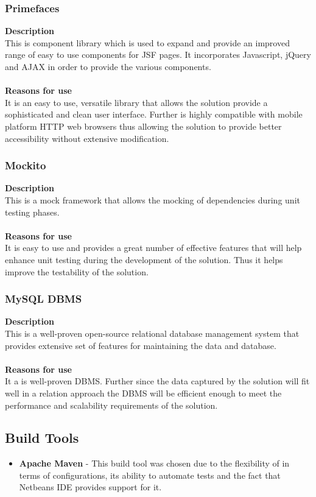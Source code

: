 \documentclass[12pt]{article}
\begin{document}
\subsubsection{Primefaces}
\textbf{Description}\\
This is component library which is used to expand and provide an improved range of easy to use components for JSF pages. It incorporates Javascript, jQuery and AJAX in order to provide the various components.\\\\
\textbf{Reasons for use}\\
It is an easy to use, versatile library that allows the solution provide a sophisticated and clean user interface. Further is highly compatible with mobile platform HTTP web browsers thus allowing the solution to provide better accessibility without extensive modification.    

\subsubsection{Mockito}
\textbf{Description}\\
This is a mock framework that allows the mocking of dependencies during unit testing phases.\\\\
\textbf{Reasons for use}\\
It is easy to use and provides a great number of effective features that will help enhance unit testing during the development of the solution. Thus it helps improve the testability of the solution.

\subsubsection{MySQL DBMS}
\textbf{Description}\\
This is a well-proven open-source relational database management system that provides extensive set of features for maintaining the data and database.\\\\
\textbf{Reasons for use}\\
It a is well-proven DBMS. Further since the data captured by the solution will fit well in a relation approach the DBMS will be efficient enough to meet the performance and scalability requirements of the solution.


\subsection*{Build Tools}
\begin{itemize}
\item \textbf{Apache Maven} - This build tool was chosen due to the flexibility of in terms of configurations, its ability to automate tests and the fact that Netbeans IDE provides support for it. 
\end{itemize}
\end{document}
